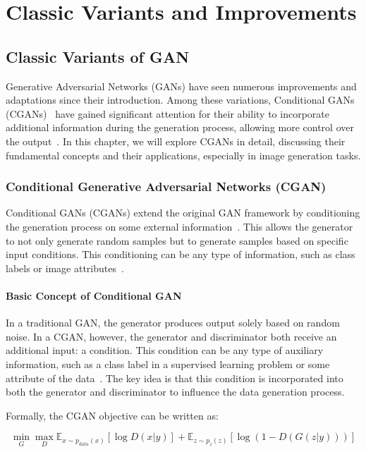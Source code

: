 \part{Classic Variants and Improvements}

\chapter{Classic Variants of GAN}
Generative Adversarial Networks (GANs) have seen numerous improvements and adaptations since their introduction. Among these variations, Conditional GANs (CGANs)~\cite{mirza2014conditional} have gained significant attention for their ability to incorporate additional information during the generation process, allowing more control over the output~\cite{wang2018cgan}. In this chapter, we will explore CGANs in detail, discussing their fundamental concepts and their applications, especially in image generation tasks.

\section{Conditional Generative Adversarial Networks (CGAN)}
Conditional GANs (CGANs) extend the original GAN framework by conditioning the generation process on some external information~\cite{li2020gan}. This allows the generator to not only generate random samples but to generate samples based on specific input conditions. This conditioning can be any type of information, such as class labels or image attributes~\cite{mirza2014conditional, wang2018cgan}.

\subsection{Basic Concept of Conditional GAN}
In a traditional GAN, the generator produces output solely based on random noise. In a CGAN, however, the generator and discriminator both receive an additional input: a condition. This condition can be any type of auxiliary information, such as a class label in a supervised learning problem or some attribute of the data~\cite{wang2018cgan}. The key idea is that this condition is incorporated into both the generator and discriminator to influence the data generation process.

Formally, the CGAN objective can be written as:

\[
\min_G \max_D \mathbb{E}_{x \sim p_{\text{data}}(x)}[\log D(x|y)] + \mathbb{E}_{z \sim p_z(z)}[\log(1 - D(G(z|y)))]
\]

